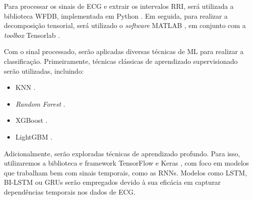 Para processar os sinais de \gls{ECG} e extrair os intervalos \gls{RRI}, será utilizada a biblioteca WFDB, implementada em Python \cite{xieWaveformDatabaseSoftware2021}. Em seguida, para realizar a decomposição tensorial, será utilizado o \textit{software} MATLAB \cite{MATLAB}, em conjunto com a \textit{toolbox} Tensorlab \cite{vervlietTensorlab30Numerical2016}.

Com o sinal processado, serão aplicadas diversas técnicas de \gls{ML} para realizar a classificação. Primeiramente, técnicas clássicas de aprendizado supervisionado serão utilizadas, incluindo:

\begin{itemize}
    \item \gls{KNN} \cite{kramerKNearestNeighbors2013}.
    \item \textit{Random Forest} \cite{breimanRandomForests2001a}.
    \item \gls{XGBoost} \cite{10.1145/2939672.2939785}.
    \item \gls{LightGBM} \cite{keLightGBMHighlyEfficient2017}.
\end{itemize}

Adicionalmente, serão exploradas técnicas de aprendizado profundo. Para isso, utilizaremos a biblioteca e framework TensorFlow e Keras \cite{tensorflow2015-whitepaper}, com foco em modelos que trabalham bem com sinais temporais, como as \gls{RNN}s. Modelos como \gls{LSTM}, BI-\gls{LSTM} ou GRUs serão empregados devido à sua eficácia em capturar dependências temporais nos dados de \gls{ECG}.





